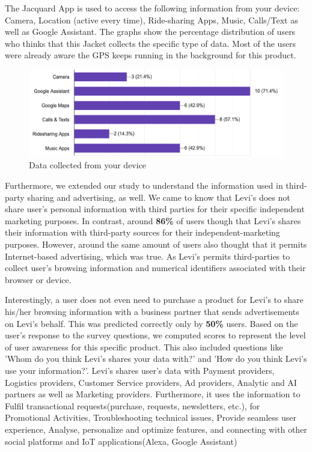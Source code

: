 \documentclass[sigconf]{acmart}
\begin{document}
The Jacquard App is used to access the following information from your device: Camera, Location (active every time), Ride-sharing Apps, Music, Calls/Text as well as Google Assistant. The graphs show the percentage distribution of users who thinks that this Jacket collects the specific type of data. Most of the users were already aware the GPS keeps running in the background for this product.

\begin{figure}[h]
  \centering
  \includegraphics[width=\linewidth]{device.png}
  \caption{Data collected from your device}
  \label{fig:jacketSix}
  \Description{}
\end{figure}

Furthermore, we extended our study to understand the information used in third-party sharing and advertising, as well. We came to know that Levi's does not share user's personal information with third parties for their specific independent marketing purposes. In contrast, around \textbf{86\%} of users though that Levi's shares their information with third-party sources for their independent-marketing purposes. However, around the same amount of users also thought that it permits Internet-based advertising, which was true. As Levi's permits third-parties to collect user's browsing information and numerical identifiers associated with their browser or device. 

Interestingly,  a user does not even need to purchase a product for Levi's to share his/her browsing information with a business partner that sends advertisements on Levi's behalf. This was predicted correctly only by \textbf{50\%} users. Based on the user's response to the survey questions, we computed scores to represent the level of user awareness for this specific product. This also included questions like 'Whom do you think Levi's shares your data with?' and 'How do you think Levi's use your information?'. Levi's shares user's data with Payment providers, Logistics providers, Customer Service providers, Ad providers, Analytic and AI partners as well as Marketing providers. Furthermore, it uses the information to Fulfil transactional requests(purchase, requests, newsletters, etc.), for Promotional Activities, Troubleshooting technical issues, Provide seamless user experience, Analyse, personalize and optimize features, and connecting with other social platforms and IoT applications(Alexa, Google Assistant)
\end{document}
